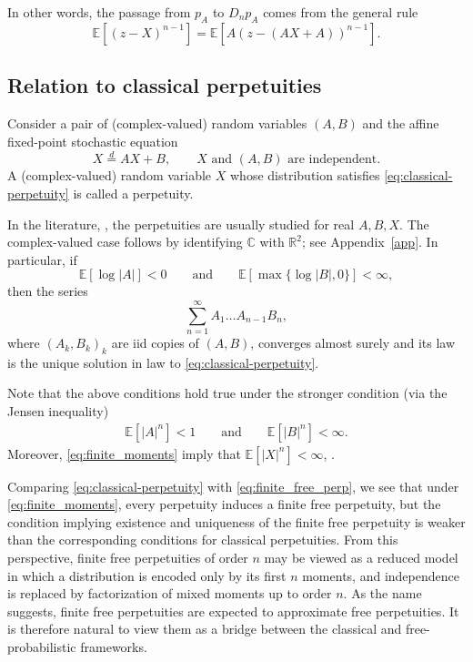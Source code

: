 \documentclass[a4paper,11pt]{amsart}
\numberwithin{equation}{section}
\newcommand{\C}{\mathbb{C}}
\newcommand{\E}{\mathbb{E}}
\newcommand{\R}{\mathbb{R}}
\begin{document}
In other words, the passage from \(p_A\) to \(D_n p_A\) comes from the general rule
\[
\E[(z-X)^{n-1}]
=
\E\left[A(z-(AX+A))^{n-1}\right].
\]

\subsection{Relation to classical perpetuities}
Consider a pair of (complex-valued) random variables $(A,B)$ and the affine fixed-point stochastic equation
\begin{equation}\label{eq:classical-perpetuity}
X \stackrel{d}{=} AX+B,\qquad X\mbox{ and }(A,B)\mbox{ are independent.}
\end{equation}
A (complex-valued) random variable $X$ whose distribution satisfies
\eqref{eq:classical-perpetuity} is called a  perpetuity.

In the literature, \cite{BurBook16}, the perpetuities are usually studied for real $A,B,X$. The complex-valued case follows by identifying \(\C\) with \(\R^2\); see Appendix~\ref{app}.
In particular, if
\[
\E[\log |A|]<0
\qquad\mbox{and}\qquad
\E[\max\{\log |B|,0\}]<\infty,
\]
then the series
\[
\sum_{n=1}^\infty A_1\ldots A_{n-1} B_n,
\]
where $(A_k,B_k)_{k}$ are iid copies of $(A,B)$, 
converges almost surely and its law is the unique solution in law to \eqref{eq:classical-perpetuity}. 


Note that the above conditions hold true under the stronger condition (via the Jensen inequality)
\begin{align}\label{eq:finite_moments}
\E[|A|^n]<1
\qquad\text{and}\qquad
\E[|B|^n]<\infty.
\end{align}
Moreover, \eqref{eq:finite_moments} imply that \(\E[|X|^n]<\infty\), \cite[Section 2.3]{BurBook16}.  

Comparing \eqref{eq:classical-perpetuity} with \eqref{eq:finite_free_perp}, we see that under \eqref{eq:finite_moments}, every perpetuity induces a finite free perpetuity, but the condition implying existence and uniqueness of the finite free perpetuity is weaker than the corresponding conditions for classical perpetuities. From this perspective, finite free perpetuities of order $n$ may be viewed as a reduced model in which a distribution is encoded only by its first $n$ moments, and independence is replaced by factorization of mixed moments up to order $n$. As the name suggests, finite free perpetuities are expected to approximate free perpetuities. It is therefore natural to view them as a bridge between the classical and free-probabilistic frameworks. 
\end{document}
